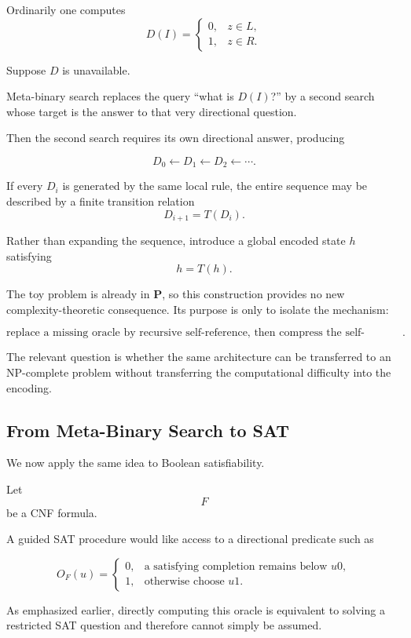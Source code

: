 \documentclass[11pt]{article}
\theoremstyle{plain}
\theoremstyle{definition}
\begin{document}
Ordinarily one computes
\[
    D(I)=
    \begin{cases}
        0,&z\in L,\\
        1,&z\in R.
    \end{cases}
\]

Suppose \(D\) is unavailable.

Meta-binary search replaces the query ``what is \(D(I)\)?'' by a second search
whose target is the answer to that very directional question.

Then the second search requires its own directional answer, producing

\[
    D_0
    \leftarrow
    D_1
    \leftarrow
    D_2
    \leftarrow
    \cdots.
\]

If every \(D_i\) is generated by the same local rule, the entire sequence may
be described by a finite transition relation
\[
    D_{i+1}=T(D_i).
\]

Rather than expanding the sequence, introduce a global encoded state \(h\)
satisfying
\[
    h=T(h).
\]

The toy problem is already in \(\mathbf{P}\), so this construction provides no
new complexity-theoretic consequence.  Its purpose is only to isolate the
mechanism:

\[
\boxed{
\text{replace a missing oracle by recursive self-reference, then compress the
self-reference globally}.
}
\]

The relevant question is whether the same architecture can be transferred to
an NP-complete problem without transferring the computational difficulty into
the encoding.

\subsection{From Meta-Binary Search to SAT}

We now apply the same idea to Boolean satisfiability.

Let
\[
    F
\]
be a CNF formula.

A guided SAT procedure would like access to a directional predicate such as

\[
    O_F(u)=
    \begin{cases}
        0,&\text{a satisfying completion remains below }u0,\\
        1,&\text{otherwise choose }u1.
    \end{cases}
\]

As emphasized earlier, directly computing this oracle is equivalent to solving
a restricted SAT question and therefore cannot simply be assumed.
\end{document}
